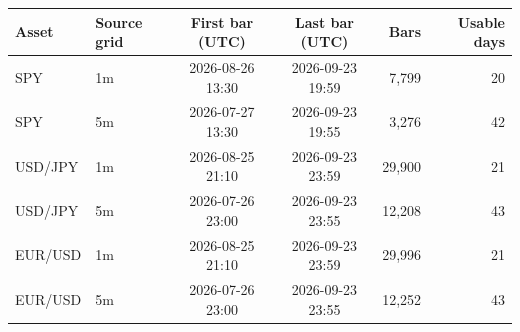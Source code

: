 \begin{tabular}{llccrr}
\toprule
Asset & Source grid & First bar (UTC) & Last bar (UTC) & Bars & Usable days \\
\midrule
SPY & 1m & \shortstack{2026-08-26\\13:30} & \shortstack{2026-09-23\\19:59} & 7,799 & 20 \\
SPY & 5m & \shortstack{2026-07-27\\13:30} & \shortstack{2026-09-23\\19:55} & 3,276 & 42 \\
USD/JPY & 1m & \shortstack{2026-08-25\\21:10} & \shortstack{2026-09-23\\23:59} & 29,900 & 21 \\
USD/JPY & 5m & \shortstack{2026-07-26\\23:00} & \shortstack{2026-09-23\\23:55} & 12,208 & 43 \\
EUR/USD & 1m & \shortstack{2026-08-25\\21:10} & \shortstack{2026-09-23\\23:59} & 29,996 & 21 \\
EUR/USD & 5m & \shortstack{2026-07-26\\23:00} & \shortstack{2026-09-23\\23:55} & 12,252 & 43 \\
\bottomrule
\end{tabular}
